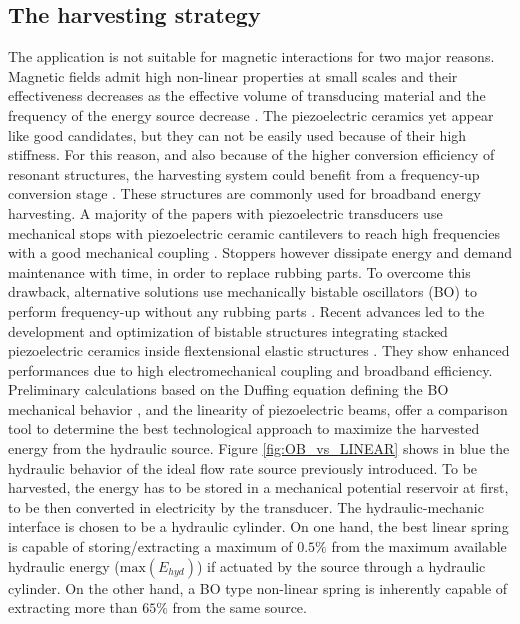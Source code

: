 \documentclass[3p,twocolumn,preprint]{elsarticle}
\begin{document}
	\subsection{The harvesting strategy}	
	\label{The harvesting strategy}
The application is not suitable for magnetic interactions for two major reasons. Magnetic fields admit high non-linear properties at small scales and their effectiveness decreases as the effective volume of transducing material and the frequency of the energy source decrease \cite{Priya2017,Kulah2008}. The piezoelectric ceramics yet appear like good candidates, but they can not be easily used because of their high stiffness. For this reason, and also because of the higher conversion efficiency of resonant structures, the harvesting system could benefit from a frequency-up conversion stage \cite{Ashraf2011,Peng2021}. These structures are commonly used for broadband energy harvesting. A majority of the papers with piezoelectric transducers use mechanical stops with piezoelectric ceramic cantilevers to reach high frequencies with a good mechanical coupling \cite{Edwards2013,Gu2011,Lee2007}. Stoppers however dissipate energy and demand maintenance with time, in order to replace rubbing parts. To overcome this drawback, alternative solutions use mechanically bistable oscillators (BO) to perform frequency-up without any rubbing parts \cite{Vocca2012}. Recent advances 
led to the development and optimization of  bistable structures integrating stacked piezoelectric ceramics inside flextensional elastic structures \cite{Huguet2017}. They show enhanced performances due to high electromechanical coupling and broadband efficiency.
Preliminary calculations based on the Duffing equation defining the BO mechanical behavior \cite{Tseng1971}, and the linearity of piezoelectric beams, offer a comparison tool to determine the best technological approach to maximize the harvested energy from the hydraulic source. Figure \ref{fig:OB_vs_LINEAR} shows in blue the hydraulic behavior of the ideal flow rate source previously introduced. To be harvested, the energy has to be stored in a mechanical potential reservoir at first, to be then converted in electricity by the transducer. The hydraulic-mechanic interface is chosen to be a hydraulic cylinder. On one hand, the best linear spring is capable of storing/extracting a maximum of $0.5\%$ from the maximum available hydraulic energy ($\text{max}(E_{hyd})$) if actuated by the source through a hydraulic cylinder. On the other hand, a BO type non-linear spring is inherently capable of extracting more than $65\%$ from the same source.
\end{document}
